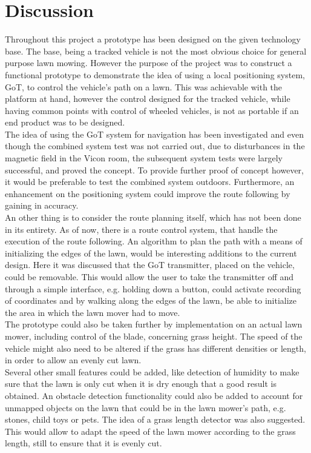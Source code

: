 \chapter{Discussion}
Throughout this project a prototype has been designed on the given technology base. The base, being a tracked vehicle is not the most obvious choice for general purpose lawn mowing. However the purpose of the project was to construct a functional prototype to demonstrate the idea of using a local positioning system, GoT, to control the vehicle's path on a lawn. This was achievable with the platform at hand, however the control designed for the tracked vehicle, while having common points with control of wheeled vehicles, is not as portable if an end product was to be designed.\\
The idea of using the GoT system for navigation has been investigated and even though the combined system test was not carried out, due to disturbances in the magnetic field in the Vicon room, the subsequent system tests were largely successful, and proved the concept. To provide further proof of concept however, it would be preferable to test the combined system outdoors. Furthermore, an enhancement on the positioning system could improve the route following by gaining in accuracy. \\
An other thing is to consider the route planning itself, which has not been done in its entirety. As of now, there is a route control system, that handle the execution of the route following. An algorithm to plan the path with a means of initializing the edges of the lawn, would be interesting additions to the current design. Here it was discussed that the GoT transmitter, placed on the vehicle, could be removable. This would allow the user to take the transmitter off and through a simple interface, e.g. holding down a button, could activate recording of coordinates and by walking along the edges of the lawn, be able to initialize the area in which the lawn mover had to move.\\
The prototype could also be taken further by implementation on an actual lawn mower, including control of the blade, concerning grass height. The speed of the vehicle might also need to be altered if the grass has different densities or length, in order to allow an evenly cut lawn.\\
Several other small features could be added, like detection of humidity to make sure that the lawn is only cut when it is dry enough that a good result is obtained. An obstacle detection functionality could also be added to account for unmapped objects on the lawn that could be in the lawn mower's path, e.g. stones, child toys or pets. The idea of a grass length detector was also suggested. This would allow to adapt the speed of the lawn mower according to the grass length, still to ensure that it is evenly cut.

